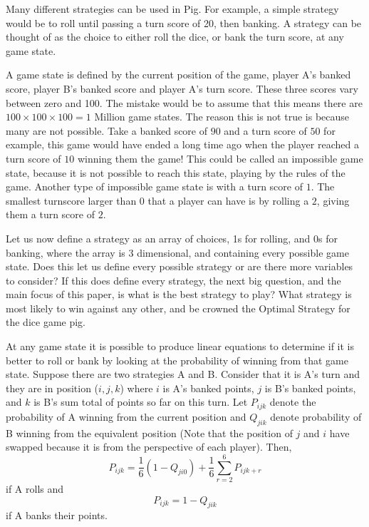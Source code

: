 \documentclass[a4paper,titlepage]{article}
\begin{document}
Many different strategies can be used in Pig. For example, a simple strategy would be to roll until passing a turn score of 20, then banking. A strategy can be thought of as the choice to either roll the dice, or bank the turn score, at any game state.

A game state is defined by the current position of the game, player A's banked score, player B's banked score and player A's turn score. These three scores vary between zero and 100. The mistake would be to assume that this means there are $100\times100\times100 = 1$ Million game states. The reason this is not true is because many are not possible. Take a banked score of $90$ and a turn score of $50$ for example, this game would have ended a long time ago when the player reached a turn score of $10$ winning them the game! This could be called an impossible game state, because it is not possible to reach this state, playing by the rules of the game. Another type of impossible game state is with a turn score of $1$. The smallest turnscore larger than $0$ that a player can have is by rolling a $2$, giving them a turn score of $2$.

Let us now define a strategy as an array of choices, 1s for rolling, and 0s for banking, where the array is 3 dimensional, and containing every possible game state. Does this let us define every possible strategy or are there more variables to consider? If this does define every strategy, the next big question, and the main focus of this paper, is what is the best strategy to play? What strategy is most likely to win against any other, and be crowned the Optimal Strategy for the dice game pig.

At any game state it is possible to produce linear equations to determine if it is better to roll or bank by looking at the probability of winning from that game state. Suppose there are two strategies A and B. Consider that it is A's turn and they are in position ($i,j,k$) where $i$ is A's banked points, $j$ is B's banked points, and $k$ is B's sum total of points so far on this turn. Let $P_{ijk}$ denote the probability of A winning from the current position and $Q_{jik}$ denote probability of B winning from the equivalent position (Note that the position of $j$ and $i$ have swapped because it is from the perspective of each player). Then,
\begin{equation}\label{1.2.1.a}
P_{ijk} = \dfrac{1}{6} (1-Q_{ji0}) + \dfrac{1}{6}\sum^{6}_{r=2}P_{ijk+r}
\end{equation}
if A rolls and
\begin{equation}\label{1.2.1.b}
P_{ijk} = 1-Q_{jik}
\end{equation}
if A banks their points.
\end{document}
